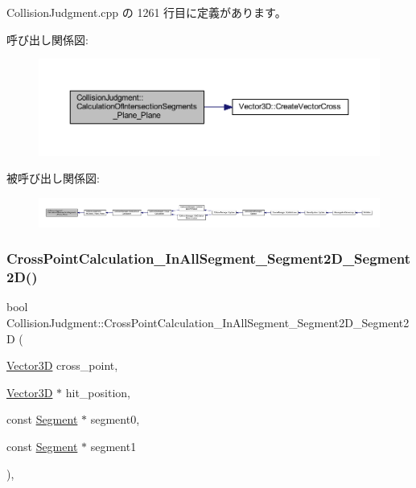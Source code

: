  Collision\+Judgment.\+cpp の 1261 行目に定義があります。

呼び出し関係図\+:\nopagebreak
\begin{figure}[H]
\begin{center}
\leavevmode
\includegraphics[width=350pt]{class_collision_judgment_ab454b739b07f965ae4c3c94c53357b45_cgraph}
\end{center}
\end{figure}
被呼び出し関係図\+:
\nopagebreak
\begin{figure}[H]
\begin{center}
\leavevmode
\includegraphics[width=350pt]{class_collision_judgment_ab454b739b07f965ae4c3c94c53357b45_icgraph}
\end{center}
\end{figure}
\mbox{\label{class_collision_judgment_a93ec7cb67dde5798661d14c52272dc99}} 
\subsubsection{\texorpdfstring{Cross\+Point\+Calculation\+\_\+\+In\+All\+Segment\+\_\+\+Segment2\+D\+\_\+\+Segment2\+D()}{CrossPointCalculation\_InAllSegment\_Segment2D\_Segment2D()}}
{\footnotesize\ttfamily bool Collision\+Judgment\+::\+Cross\+Point\+Calculation\+\_\+\+In\+All\+Segment\+\_\+\+Segment2\+D\+\_\+\+Segment2D (\begin{DoxyParamCaption}\item[{\mbox{\hyperlink{class_vector3_d}{Vector3D}}}]{cross\+\_\+point,  }\item[{\mbox{\hyperlink{class_vector3_d}{Vector3D}} $\ast$}]{hit\+\_\+position,  }\item[{const \mbox{\hyperlink{class_segment}{Segment}} $\ast$}]{segment0,  }\item[{const \mbox{\hyperlink{class_segment}{Segment}} $\ast$}]{segment1 }\end{DoxyParamCaption})\hspace{0.3cm}{\ttfamily [static]}, {\ttfamily [private]}}



